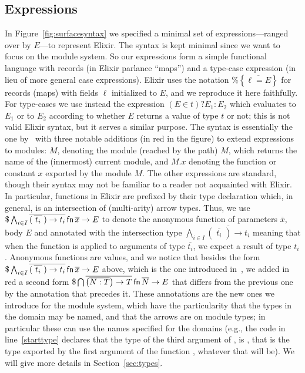 \documentclass[a4paper,10pt]{article}
\begin{document}
\subsection{Expressions}
In Figure~\ref{fig:surfacesyntax} we specified a minimal set of expressions---ranged over by $E$---to represent Elixir. The syntax is kept minimal since we want to focus on the module system. So our expressions form a simple functional language with records (in Elixir parlance ``maps'') and a type-case expression (in lieu of more general case expressions).  Elixir uses the notation $\texttt{\%}\!\left\{\overline{\ell=E}\right\}$ for records (maps) with fields $\ell$ initialized to $E$, and we reproduce it here faithfully. For type-cases we use instead the expression $(E\in t)?E_1:E_2$ which evaluates to $E_1$ or to $E_2$ according to whether $E$ returns a value of type $t$ or not; this is not valid Elixir syntax, but it serves a similar purpose. The syntax is essentially the one by~\cite{CDV24} with three notable additions (in red in the figure) to extend expressions to modules: $M$, denoting the module (reached by the path) $M$, \self{} which returns the name of the (innermost) current module, and $M.x$ denoting the function or constant $x$ exported by the module $M$. The other expressions are standard, though their syntax may not be familiar to a reader not acquainted with Elixir. In particular, functions in Elixir are prefixed by their type declaration which, in general, is an intersection of (multi-arity) arrow types. Thus, we use $\$\bigwedge_{i\in I} \overline{(\,\overline{\,t_i\,}\,)\rightarrow t_i} \operatorname{\textsf{fn}} \overline{x} \rightarrow E$ to denote the anonymous function of parameters $\overline{x}$, body $E$ and annotated with the intersection type $\bigwedge_{i\in I} \overline{(\,\overline{\,t_i\,}\,)\rightarrow t_i}$ meaning that when the function is applied to arguments of type $\overline{t_i}$, we expect a result of type $t_i$. Anonymous functions are values, and we notice that besides the form $\$\bigwedge_{i\in I} \overline{(\,\overline{\,t_i\,}\,)\rightarrow t_i} \operatorname{\textsf{fn}} \overline{x} \rightarrow E$ above, which is the one introduced in~\cite{CDV24}, we added in red a second form $\$\bigcap \overline{\left(\overline{N:T}\right)\rightarrow T} \operatorname{\textsf{fn}} \overline{N}\rightarrow E$ that differs from  the previous one by the annotation that precedes it. These annotations are the new ones we introduce for the module system, which have the particularity that the types in the domain may be named, and that the arrows are on module types; in particular these can use the names specified for the domains (e.g., the code in line~\ref{starttype} declares that the type of the third argument of , is , that is the  type exported by the first argument of the function , whatever that will be). We will give more details in Section~\ref{sec:types}.
\end{document}
